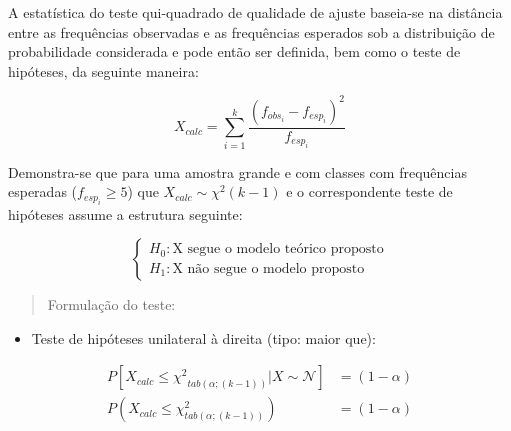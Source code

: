 \documentclass[
]{book}
\providecommand{\tightlist}{%
  \setlength{\itemsep}{0pt}\setlength{\parskip}{0pt}}
\begin{document}
\hfill\break

A estatística do teste qui-quadrado de qualidade de ajuste baseia-se na distância entre as frequências observadas e as frequências esperados sob a distribuição de probabilidade considerada e pode então ser definida, bem como o teste de hipóteses, da seguinte maneira:

\hfill\break

\[
X_{calc}=    \sum_{i=1}^k \frac{(f_{obs_i} - f_{esp_i})^2}{f_{esp_i}}
\]

\hfill\break

Demonstra-se que para uma amostra grande e com classes com frequências esperadas (\(f_{esp_i}\ge 5\)) que \(X_{calc} \sim \chi^{2} (k-1)\) e o correspondente teste de hipóteses assume a estrutura seguinte:

\[
\begin{cases}
H_{0}: \text{X segue o modelo teórico proposto} \\
H_{1}: \text{X não segue o modelo proposto} 
\end{cases}
\]

\hfill\break

\begin{quote}
Formulação do teste:
\end{quote}

\hfill\break

\begin{itemize}
\tightlist
\item
  Teste de hipóteses unilateral à direita (tipo: maior que):
\end{itemize}

\hfill\break

\begin{align*}
P[X_{calc} \le {\chi^{2}}_{tab \left(\alpha ;(k-1) \right)} | X \sim  \mathcal{N}] & =(1-\alpha) \\  
P(X_{calc}  \le  \chi^{2}_{tab \left(\alpha ;(k-1) \right)}) & =(1-\alpha)
\end{align*}
\end{document}
